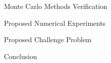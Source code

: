 \documentclass{beamer}
\begin{document}
\begin{frame}{Monte Carlo Methods Verification}

\end{frame}

\begin{frame}{Proposed Numerical Experiments}

\end{frame}

\begin{frame}{Proposed Challenge Problem}

\end{frame}

\begin{frame}{Conclusion}

\end{frame}

\end{document}
